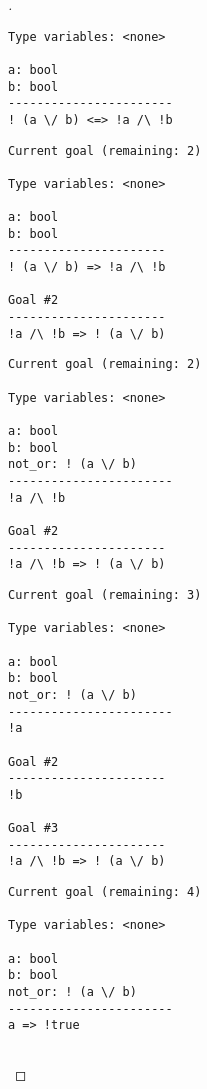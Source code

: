 \begin{enumerate}
\begin{proof}[\sol]
\begin{center}
\begin{minipage}[t]{.275\textwidth}
\begin{lstlisting}[style=normal]
Type variables: <none>

a: bool
b: bool
-----------------------
! (a \/ b) <=> !a /\ !b
\end{lstlisting}
\vfill
\end{minipage}\hfill
\begin{minipage}[t]{.3\textwidth}
\centering{}
\begin{lstlisting}[style=normal]
Current goal (remaining: 2)

Type variables: <none>

a: bool
b: bool
----------------------
! (a \/ b) => !a /\ !b

Goal #2
----------------------
!a /\ !b => ! (a \/ b)
\end{lstlisting}
\end{minipage}\hfill
\begin{minipage}[t]{.3\textwidth}
\centering{}
\begin{lstlisting}[style=normal]
Current goal (remaining: 2)

Type variables: <none>

a: bool
b: bool
not_or: ! (a \/ b)
-----------------------
!a /\ !b

Goal #2
----------------------
!a /\ !b => ! (a \/ b)
\end{lstlisting}
\end{minipage}
\end{center}

\begin{center}
\begin{minipage}[t]{.3\textwidth}
\centering{}
\begin{lstlisting}[style=normal]
Current goal (remaining: 3)

Type variables: <none>

a: bool
b: bool
not_or: ! (a \/ b)
-----------------------
!a

Goal #2
----------------------
!b

Goal #3
----------------------
!a /\ !b => ! (a \/ b)
\end{lstlisting}
\vfill
\end{minipage}\hfill
\begin{minipage}[t]{.3\textwidth}
\centering{}
\begin{lstlisting}[style=normal]
Current goal (remaining: 4)

Type variables: <none>

a: bool
b: bool
not_or: ! (a \/ b)
-----------------------
a => !true


\end{lstlisting}
\end{minipage}
\end{center}
\end{proof}
\end{enumerate}
